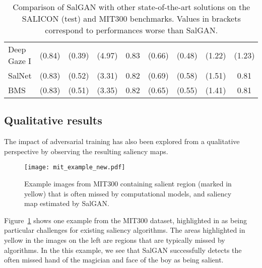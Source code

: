 \documentclass[times,twocolumn,final,authoryear]{elsarticle}
\begin{document}
\begin{table*}
\begin{center}
\begin{tabular}{lcccccccc}
Deep Gaze I \citep{kummerer2015deep} & (0.84)& (0.39) & (4.97)	& 0.83		& (0.66)	& (0.48)	& (1.22)	& (1.23) \\
SalNet	\citep{Pan_2016_CVPR}& (0.83)		& (0.52) & (3.31)	& 0.82		& (0.69)	& (0.58)	& (1.51)	& 0.81 \\
BMS \citep{Zhang2013iccv}	& (0.83)	& (0.51)	& (3.35)	& 0.82		& (0.65)	& (0.55)	& (1.41)	& 0.81 \\ 			
\hline
\end{tabular}
\end{center}
\caption{Comparison of SalGAN with other state-of-the-art solutions on the SALICON (test) and MIT300 benchmarks. Values in brackets correspond to performances worse than SalGAN.}
\label{tab:soa}
\end{table*}

\subsection{Qualitative results}

The impact of adversarial training has also been explored from a qualitative perspective by observing the resulting saliency maps.
\begin{figure}[t]
\texttt{[image: mit\_example\_new.pdf]}
\caption{Example images from MIT300 containing salient region (marked in yellow) that is often missed by computational models, and saliency map estimated by SalGAN.}
\label{fig:MITExamples}
\end{figure}
Figure~\ref{fig:MITExamples} shows one example from the MIT300 dataset, highlighted in \citep{Bylinsk2016eccv} as being particular challenges for existing saliency algorithms. The areas highlighted in yellow in the images on the left are regions that are typically missed by algorithms. In the this  example, we see that SalGAN successfully detects the often missed hand of the magician and face of the boy as being salient. 
\end{document}
